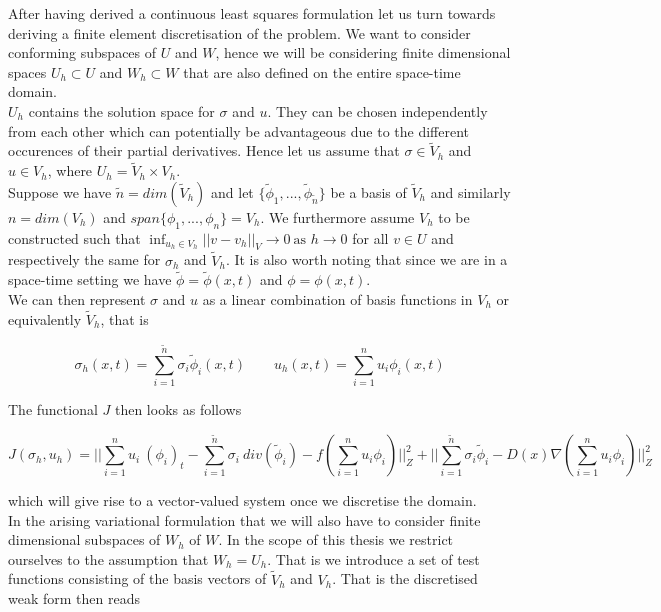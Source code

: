 \documentclass[../draft_1.tex]{subfiles}
\begin{document}
After having derived a continuous least squares formulation let us turn towards deriving a finite element discretisation of the problem. We want to consider conforming subspaces of $U$ and $W$, hence we will be considering finite dimensional spaces $U_h \subset U$ and $W_h \subset W$ that are also defined on the entire space-time domain. 
\smallskip
\\
$U_h$ contains the solution space for $\sigma$ and $u$. They can be chosen independently from each other which can potentially be advantageous due to the different occurences of their partial derivatives. Hence let us assume that $\sigma \in \tilde{V}_h$ and $u \in V_h$, where $ U_h = \tilde{V}_h \times V_h$. 
\smallskip
\\ 
Suppose we have $\tilde{n} = dim(\tilde{V}_h)$ and let $ \{\tilde{\phi}_1, ..., \tilde{\phi}_{\tilde{n}}\} $ be a basis of $\tilde{V}_h$ and similarly $n = dim(V_h)$ and $span \{\phi_1, ..., \phi_n\}  = V_h$. We furthermore assume $V_h$ to be constructed such that $\inf_{u_h \in V_h} || v - v_h||_V \rightarrow 0 \ \text{as } h \rightarrow 0$ for all $v \in U$ and respectively the same for $\sigma_h$ and $\tilde{V}_h$. It is also worth noting that since we are in a space-time setting we have $\tilde{\phi} = \tilde{\phi}(x,t)$ and  $\phi = \phi(x,t)$.
\smallskip
\\ 
We can then represent $\sigma$ and $u$ as a linear combination of basis functions in $V_h$ or equivalently $\tilde{V}_h$, that is
\begin{ceqn}
	\begin{equation}
 	\sigma_h(x,t) = \sum_{i = 1}^{\tilde{n}} \sigma_i \tilde{\phi}_i(x,t) \qquad 
	u_h(x,t) = \sum_{i = 1}^{n} u_i \phi_i(x,t) 
	\end{equation}
\end{ceqn}
The functional $J$ then looks as follows 
\begin{ceqn}
	\begin{equation}
J(\sigma_h, u_h) =|| \sum_{i=1}^{n} u_i \ (\phi_i)_t - \sum_{i=1}^{\tilde{n}} \sigma_i \ div(\tilde{\phi}_i) - f(\sum_{i=1}^{n} u_i \phi_i) ||_Z^2 + || \sum_{i=1}^{\tilde{n}} \sigma_i \tilde{\phi}_i - D(x) \nabla (\sum_{i=1}^{n} u_i \phi_i) || _Z^2
	\end{equation}
\end{ceqn}
which will give rise to a vector-valued system once we discretise the domain. 
\smallskip
\\ 
In the arising variational formulation that we will also have to consider finite dimensional subspaces of $W_h$ of $W$. In the scope of this thesis we restrict ourselves to the assumption that $W_h = U_h$. That is we introduce a set of test functions consisting of the basis vectors of $\tilde{V}_h$ and $V_h$. That is the discretised weak form then reads 
\end{document}
